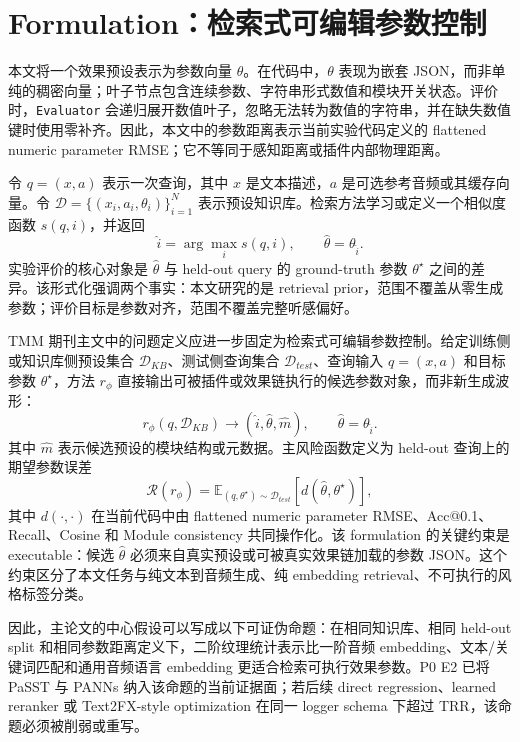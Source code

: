 \chapter{Formulation：检索式可编辑参数控制}
\label{chap:formulation}

本文将一个效果预设表示为参数向量 $\theta$。在代码中，$\theta$ 表现为嵌套 JSON，而非单纯的稠密向量；叶子节点包含连续参数、字符串形式数值和模块开关状态。评价时，\texttt{Evaluator} 会递归展开数值叶子，忽略无法转为数值的字符串，并在缺失数值键时使用零补齐。因此，本文中的参数距离表示当前实验代码定义的 flattened numeric parameter RMSE；它不等同于感知距离或插件内部物理距离。

令 $q=(x,a)$ 表示一次查询，其中 $x$ 是文本描述，$a$ 是可选参考音频或其缓存向量。令 $\mathcal{D}=\{(x_i,a_i,\theta_i)\}_{i=1}^{N}$ 表示预设知识库。检索方法学习或定义一个相似度函数 $s(q,i)$，并返回
\[
	\hat{i}=\arg\max_i s(q,i), \qquad \hat{\theta}=\theta_{\hat{i}}.
\]
实验评价的核心对象是 $\hat{\theta}$ 与 held-out query 的 ground-truth 参数 $\theta^\star$ 之间的差异。该形式化强调两个事实：本文研究的是 retrieval prior，范围不覆盖从零生成参数；评价目标是参数对齐，范围不覆盖完整听感偏好。

TMM 期刊主文中的问题定义应进一步固定为检索式可编辑参数控制。给定训练侧或知识库侧预设集合 $\mathcal{D}_{KB}$、测试侧查询集合 $\mathcal{D}_{test}$、查询输入 $q=(x,a)$ 和目标参数 $\theta^\star$，方法 $r_\phi$ 直接输出可被插件或效果链执行的候选参数对象，而非新生成波形：
\[
	r_\phi(q,\mathcal{D}_{KB}) \rightarrow (\hat{i},\hat{\theta},\hat{m}), \qquad \hat{\theta}=\theta_{\hat{i}}.
\]
其中 $\hat{m}$ 表示候选预设的模块结构或元数据。主风险函数定义为 held-out 查询上的期望参数误差
\[
	\mathcal{R}(r_\phi)=\mathbb{E}_{(q,\theta^\star)\sim\mathcal{D}_{test}}\left[d(\hat{\theta},\theta^\star)\right],
\]
其中 $d(\cdot,\cdot)$ 在当前代码中由 flattened numeric parameter RMSE、Acc@0.1、Recall、Cosine 和 Module consistency 共同操作化。该 formulation 的关键约束是 executable：候选 $\hat{\theta}$ 必须来自真实预设或可被真实效果链加载的参数 JSON。这个约束区分了本文任务与纯文本到音频生成、纯 embedding retrieval、不可执行的风格标签分类。

因此，主论文的中心假设可以写成以下可证伪命题：在相同知识库、相同 held-out split 和相同参数距离定义下，二阶纹理统计表示比一阶音频 embedding、文本/关键词匹配和通用音频语言 embedding 更适合检索可执行效果参数。P0 E2 已将 PaSST 与 PANNs 纳入该命题的当前证据面；若后续 direct regression、learned reranker 或 Text2FX-style optimization 在同一 logger schema 下超过 TRR，该命题必须被削弱或重写。

